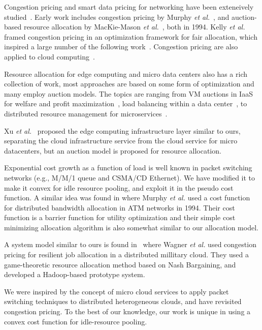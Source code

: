 Congestion pricing and smart data pricing for networking have been
exteneively studied~\cite{Sen-2013}.
Early work includes congestion pricing by
Murphy {\em et al.}~\cite{Murphy94distributedpricing},
and auction-based resource allocation by
MacKie-Mason {\em et al.}~\cite{pricing-internet-1994}, both in 1994.
Kelly {\em et al.}~\cite{Kelly-1998} framed congestion pricing in an
optimization framework for fair allocation, which inspired a large
number of the following
work~\cite{Sen-2013,gibbens1999resource,Henderson2001,Briscoe2003-M3I}.
Congestion pricing are also applied to cloud
computing~\cite{Wang-hotcloud2010,Song-2014,Kilcioglu-SIGMETRICS2015,Song-INFOCOM2017}.

Resource allocation for edge computing and micro data centers also has
a rich collection of work, most approaches are based on some form of
optimization and many employ auction models.
The topics are ranging from VM auctions in IaaS for welfare and profit
maximization~\cite{Xu2017-zenith,Zhang2017-VMauction},
load balancing within a data center~\cite{Rikhtegar2021BiTEAD,Chen-SOCC-2014},
to
distributed resource management for microservices~\cite{Suresh-SOA-SOCC2017}.

Xu {\em et al.}~\cite{Xu2017-zenith} proposed the edge computing
infrastructure layer similar to ours, separating the cloud
infrastructure service from the cloud service for micro datacenters,
but an auction model is proposed for resource allocation.

Exponential cost growth as a function of load is well known in packet
switching networks (e.g., M/M/1 queue and CSMA/CD Ethernet).
We have modified it to make it convex for idle resource pooling, and
exploit it in the pseudo cost function.
A similar idea was found in \cite{Murphy94distributedpricing} where
Murphy {\em et al.} used a cost function for distributed bandwidth
allocation in ATM networks in 1994.
Their cost function is a barrier function for utility optimization
and their simple cost minimizing allocation algorithm is also somewhat
similar to our allocation model.

A system model similar to ours is found in~\cite{Wagner-2012} where
Wagner {\em et al.} used congestion pricing for resilient job
allocation in a distributed millitary cloud.  They used a
game-theoretic resource allocation method based on Nash Bargaining,
and developed a Hadoop-based prototype system.

We were inspired by the concept of micro cloud services to apply packet
switching techniques to distributed heterogeneous clouds, and have
revisited congestion pricing.
To the best of our knowledge, our work is unique in using a convex
cost function for idle-resource pooling.



